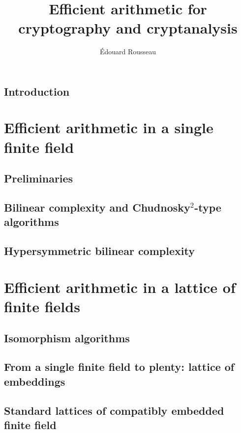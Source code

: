 \documentclass[a4paper,11pt]{report}
\title{Efficient arithmetic for cryptography and cryptanalysis}
\author{Édouard Rousseau}
\begin{document}
\maketitle



\dominitoc
\tableofcontents


\chapter{Introduction}


\part{Efficient arithmetic in a single finite field}
\label{part:single}

\chapter{Preliminaries}
\label{chap:preliminary}


\chapter{Bilinear complexity and Chudnosky$^2$-type algorithms}
\label{chap:bilinear}


\chapter{Hypersymmetric bilinear complexity}
\label{chap:hypersymmetric}


\part{Efficient arithmetic in a lattice of finite fields}
\label{part:lattice}

\chapter{Isomorphism algorithms}
\label{chap:isomorphism}


\chapter{From a single finite field to plenty: lattice of embeddings}
\label{chap:lattice}


\chapter{Standard lattices of compatibly embedded finite field}
\label{chap:standard}


\clearpage


\end{document}

